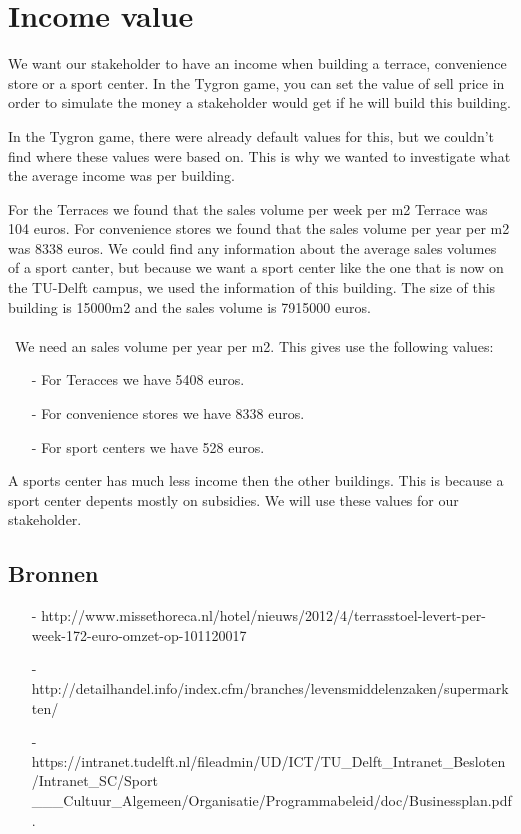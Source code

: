 \documentclass[]{article}
\begin{document}
	
\section{Income value}

We want our stakeholder to have an income when building a terrace, convenience store or a sport center.
In the Tygron game, you can set the value of sell price in order to simulate the money a stakeholder would get if he will build this building.

In the Tygron game, there were already default values for this, but we couldn't find where these values were based on. 
This is why we wanted to investigate what the average income was per building.

For the Terraces we found that the sales volume per week per m2 Terrace was 104 euros. 
For convenience stores we found that the sales volume per year per m2 was 8338 euros. 
We could find any information about the average sales volumes of a sport canter, but because we want a sport center like the one that is now on the TU-Delft campus, we used the information of this building. 
The size of this building is 15000m2 and the sales volume is 7915000 euros.
\\\\\
We need an sales volume per year per m2. This gives use the following values:
\begin{itemize}[noitemsep]
	\item[-] For Teracces we have 5408 euros.
	\item[-] For convenience stores we have 8338 euros.
	\item[-] For sport centers we have 528 euros.
\end{itemize}

A sports center has much less income then the other buildings. This is because a sport center depents mostly on subsidies. We will use these values for our stakeholder.

\subsection{Bronnen}
\begin{itemize}[noitemsep]
	\item[-] http://www.missethoreca.nl/hotel/nieuws/2012/4/terrasstoel-levert-per-week-172-euro-omzet-op-101120017
	\item[-] http://detailhandel.info/index.cfm/branches/levensmiddelenzaken/supermarkten/
	\item[-] https://intranet.tudelft.nl/fileadmin/UD/ICT/TU\_Delft\_Intranet\_Besloten/Intranet\_SC/Sport
	\_\_\_Cultuur\_Algemeen/Organisatie/Programmabeleid/doc/Businessplan.pdf.
\end{itemize}
\end{document}
